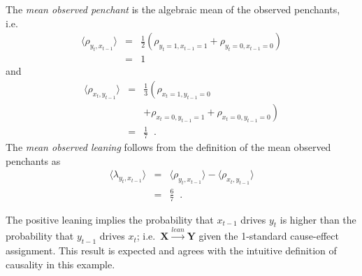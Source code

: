 \documentclass[a4paper,11pt,twocolumn]{article}
\begin{document}
The {\em mean observed penchant} is the algebraic mean of the observed penchants, i.e.\
\begin{eqnarray*}
\langle \rho_{y_t,x_{t-1}} \rangle &=& \frac{1}{2}\left(\rho_{y_t=1,x_{t-1}=1} + \rho_{y_t=0,x_{t-1}=0}\right)\\
&=& 1
\end{eqnarray*}
and
\begin{eqnarray*}
\langle \rho_{x_t,y_{t-1}} \rangle &=& \frac{1}{3}\left(\rho_{x_t=1,y_{t-1}=0} \right.\\
& &\left. +\rho_{x_t=0,y_{t-1}=1} + \rho_{x_t=0,y_{t-1}=0}\right)\\
&=& \frac{1}{7}\;\;.
\end{eqnarray*}
The {\em mean observed leaning} follows from the definition of the mean observed penchants as
\begin{eqnarray}
\label{eqn:meanlean}
\langle \lambda_{y_t,x_{t-1}} \rangle &=& \langle \rho_{y_t,x_{t-1}} \rangle - \langle \rho_{x_t,y_{t-1}} \rangle\\
&=& \frac{6}{7}\;\;.
\end{eqnarray}

The positive leaning implies the probability that $x_{t-1}$ drives $y_t$ is higher than the probability that $y_{t-1}$ drives $x_{t}$; i.e.\ $\mathbf{X}\xrightarrow{lean}\mathbf{Y}$ given the 1-standard cause-effect assignment.  This result is expected and agrees with the intuitive definition of causality in this example.  
\end{document}
